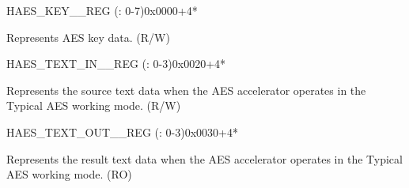 \begin{register}{H}{AES\_KEY\_\_REG (: 0-7)}{0x0000+4*}\label{regdesc:AESKEYNREG}
%
\regnewline%
\begin{regdesc}\begin{reglist}
\label{fielddesc:AESKEYN}\item [AES\_KEY\_\regindex{n}\_REG (\regindex{n}: 0-7)] Represents AES key data. (R/W)
\end{reglist}\end{regdesc}
\end{register}


\begin{register}{H}{AES\_TEXT\_IN\_\_REG (: 0-3)}{0x0020+4*}\label{regdesc:AESTEXTINNREG}
%
\regnewline%
\begin{regdesc}\begin{reglist}
\item [AES\_TEXT\_IN\_\regindex{m}\_REG (\regindex{m}: 0-3)] Represents the source text data when the AES accelerator operates in the Typical AES working mode. (R/W)
\end{reglist}\end{regdesc}
\end{register}


\begin{register}{H}{AES\_TEXT\_OUT\_\_REG (: 0-3)}{0x0030+4*}\label{regdesc:AESTEXTOUTNREG}
%
\regnewline%
\begin{regdesc}\begin{reglist}
\item [AES\_TEXT\_OUT\_\regindex{m}\_REG (\regindex{m}: 0-3)] Represents the result text data when the AES accelerator operates in the Typical AES working mode. (RO)
\end{reglist}\end{regdesc}
\end{register}


